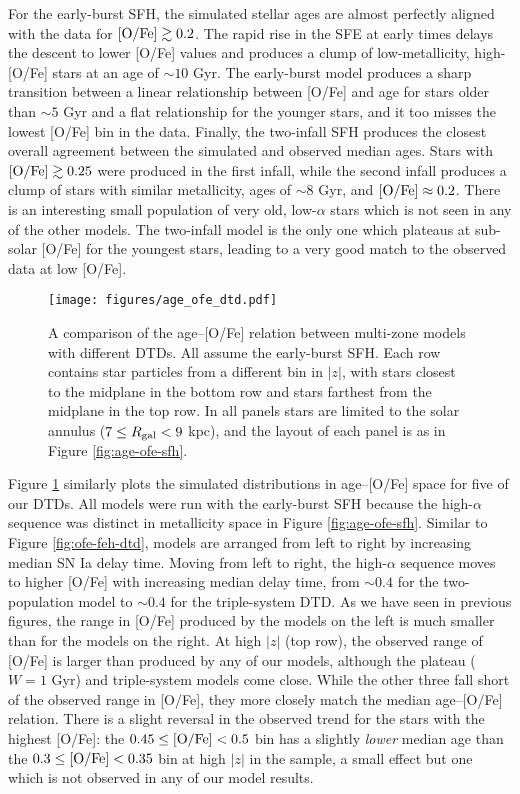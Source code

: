 \documentclass[twocolumn,twocolappendix,linenumbers,trackchanges]{aastex631}
\begin{document}
For the early-burst SFH, the simulated stellar ages are almost perfectly aligned with the data for ${\rm [O/Fe]}\gtrsim 0.2$. The rapid rise in the SFE at early times delays the descent to lower [O/Fe] values and produces a clump of low-metallicity, high-[O/Fe] stars at an age of $\sim10$ Gyr. The early-burst model produces a sharp transition between a linear relationship between [O/Fe] and age for stars older than $\sim5$ Gyr and a flat relationship for the younger stars, and it too misses the lowest [O/Fe] bin in the data. Finally, the two-infall SFH produces the closest overall agreement between the simulated and observed median ages. Stars with ${\rm [O/Fe]}\gtrsim 0.25$ were produced in the first infall, while the second infall produces a clump of stars with similar metallicity, ages of $\sim8$ Gyr, and ${\rm [O/Fe]}\approx0.2$. There is an interesting small population of very old, low-$\alpha$ stars which is not seen in any of the other models. The two-infall model is the only one which plateaus at sub-solar [O/Fe] for the youngest stars, leading to a very good match to the observed data at low [O/Fe].

\begin{figure*}
    \centering
    \texttt{[image: figures/age\_ofe\_dtd.pdf]}
    \caption{A comparison of the age--[O/Fe] relation between multi-zone models with different DTDs. All assume the early-burst SFH. Each row contains star particles from a different bin in $|z|$, with stars closest to the midplane in the bottom row and stars farthest from the midplane in the top row. In all panels stars are limited to the solar annulus ($7\leq R_{\rm gal}<9$ kpc), and the layout of each panel is as in Figure \ref{fig:age-ofe-sfh}.}
    \label{fig:age-ofe-dtd}
\end{figure*}

Figure \ref{fig:age-ofe-dtd} similarly plots the simulated distributions in age--[O/Fe] space for five of our DTDs. All models were run with the early-burst SFH because the high-$\alpha$ sequence was distinct in metallicity space in Figure \ref{fig:age-ofe-sfh}. Similar to Figure \ref{fig:ofe-feh-dtd}, models are arranged from left to right by increasing median SN Ia delay time. Moving from left to right, the high-$\alpha$ sequence moves to higher [O/Fe] with increasing median delay time, from $\sim0.4$ for the two-population model to $\sim0.4$ for the triple-system DTD. As we have seen in previous figures, the range in [O/Fe] produced by the models on the left is much smaller than for the models on the right. At high $|z|$ (top row), the observed range of [O/Fe] is larger than produced by any of our models, although the plateau ($W=1$ Gyr) and triple-system models come close. While the other three fall short of the observed range in [O/Fe], they more closely match the median age--[O/Fe] relation. There is a slight reversal in the observed trend for the stars with the highest [O/Fe]: the $0.45\leq{\rm [O/Fe]}<0.5$ bin has a slightly \textit{lower} median age than the $0.3\leq{\rm [O/Fe]}<0.35$ bin at high $|z|$ in the  sample, a small effect but one which is not observed in any of our model results.
\end{document}
